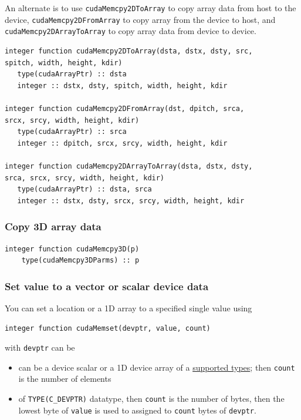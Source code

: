 An alternate is to use \verb!cudaMemcpy2DToArray! to copy array data
from host to the device, \verb!cudaMemcpy2DFromArray! to copy array
from the device to host, and \verb!cudaMemcpy2DArrayToArray! to copy
array data from device to device.
\begin{lstlisting}
integer function cudaMemcpy2DToArray(dsta, dstx, dsty, src,
spitch, width, height, kdir)
   type(cudaArrayPtr) :: dsta
   integer :: dstx, dsty, spitch, width, height, kdir

integer function cudaMemcpy2DFromArray(dst, dpitch, srca,
srcx, srcy, width, height, kdir)
   type(cudaArrayPtr) :: srca
   integer :: dpitch, srcx, srcy, width, height, kdir

integer function cudaMemcpy2DArrayToArray(dsta, dstx, dsty,
srca, srcx, srcy, width, height, kdir)
   type(cudaArrayPtr) :: dsta, srca
   integer :: dstx, dsty, srcx, srcy, width, height, kdir
\end{lstlisting}


\subsubsection{Copy 3D array data}
\label{sec:copy-3d-array}

\begin{lstlisting}
integer function cudaMemcpy3D(p)
    type(cudaMemcpy3DParms) :: p
\end{lstlisting}


\subsubsection{Set value to a vector or scalar device data}
\label{sec:set-value-vector}

You can set a location or a 1D array to a specified single value using
\begin{lstlisting}
integer function cudaMemset(devptr, value, count)
\end{lstlisting}
with \verb!devptr! can be 

\begin{itemize}
\item can be a device scalar or a 1D device array of a
  \hyperref[sec:datatype-data-device]{supported types}; then
  \verb!count!  is the number of elements

\item of \verb!TYPE(C_DEVPTR)! datatype, then \verb!count! is the
  number of bytes, then the lowest byte of \verb!value! is used to
  assigned to \verb!count! bytes of \verb!devptr!.

\end{itemize}

